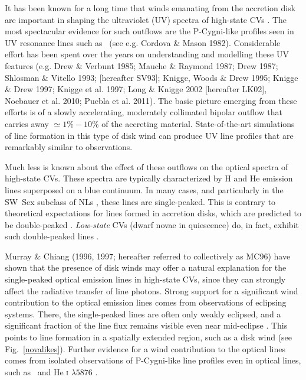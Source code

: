 \documentclass[preprint, a4paper, 11pt]{aastex}
\begin{document}
It has been known for a long time that winds emanating from the
accretion disk are important in shaping the ultraviolet (UV) spectra
of high-state CVs \citep{heap1978, greensteinoke1982}. The most spectacular evidence for such
outflows are the P-Cygni-like profiles seen in UV resonance lines such as
\civfull\ (see e.g. Cordova \& Mason
1982\nocite{cordova1982}). Considerable effort has been spent over the
years on understanding and modelling these UV features (e.g. Drew \&
Verbunt 1985\nocite{drewverbunt1985}; Mauche \& Raymond
1987\nocite{maucheraymond1987}; Drew 1987; Shlosman \& Vitello 1993; [hereafter
SV93]\nocite{SV93}; Knigge, Woods \& Drew 1995\nocite{KWD95}; 
Knigge \& Drew 1997\nocite{kd1997}; 
Knigge et al. 1997\nocite{knigge1997}; Long \& Knigge 2002 [hereafter LK02]\nocite{LK02}, 
Noebauer et al. 2010\nocite{noebauer};
Puebla et al. 2011\nocite{puebla2011}). The basic picture emerging from these efforts is
of a slowly accelerating, moderately collimated bipolar
outflow that carries away $\simeq 1\% - 10\%$ of the accreting
material. State-of-the-art simulations of line formation in this type
of disk wind can produce UV line profiles that are remarkably similar
to observations.

Much less is known about the effect of these outflows on the optical
spectra of high-state CVs. These spectra are typically characterized
by H and He emission lines superposed on a blue continuum. In many
cases, and particularly in the SW~Sex subclass of NLs
\citep{HSK86,DR95}, these lines are single-peaked. This is contrary to
theoretical expectations for lines formed in accretion disks, which
are predicted to be double-peaked \citep{smak1981, hornemarsh1986}. 
{\em Low-state} CVs (dwarf novae in quiescence) do, in fact,
exhibit such double-peaked lines \citep{marshhorne1990}. 

Murray \& Chiang (1996, 1997; hereafter referred to collectively as MC96)\nocite{MC96, MC97} 
have shown that the presence of disk winds may
offer a natural explanation for the single-peaked optical emission lines in
high-state CVs, since they can strongly affect the radiative transfer
of line photons. Strong support for a significant wind contribution to the
optical emission lines comes from observations of eclipsing
systems. There, the single-peaked lines are often only weakly
eclipsed, and a significant fraction of the line flux remains visible
even near mid-eclipse \citep[e.g.][]{baptista2000,groot2004}. 
This points to line formation in a spatially
extended region, such as a disk wind (see Fig.~\ref{novalikes}).
Further evidence for a wind contribution to the optical lines comes
from isolated observations of P-Cygni-like line profiles even in optical
lines, such as \ha\ and He \textsc{i} $\lambda5876$ \citep{patterson1996, RN98, kafka2004}.
\end{document}
